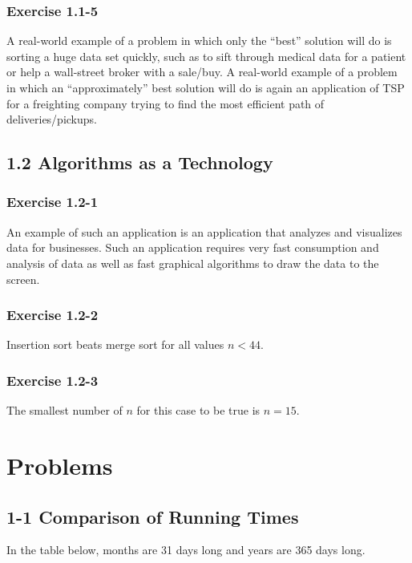 \documentclass{article}
\begin{document}
\subsubsection*{Exercise 1.1-5}

A real-world example of a problem in which only the “best” solution will do is sorting a huge data set quickly, such as to sift through medical data for a patient or help a wall-street broker with a sale/buy. A real-world example of a problem in which an “approximately” best solution will do is again an application of TSP for a freighting company trying to find the most efficient path of deliveries/pickups.

\subsection*{1.2 Algorithms as a Technology}
\subsubsection*{Exercise 1.2-1}

An example of such an application is an application that analyzes and visualizes data for businesses. Such an application requires very fast consumption and analysis of data as well as fast graphical algorithms to draw the data to the screen.

\subsubsection*{Exercise 1.2-2}

Insertion sort beats merge sort for all values $n < 44$.

\subsubsection*{Exercise 1.2-3}

The smallest number of $n$ for this case to be true is $n = 15$.

\section*{Problems}
\subsection*{1-1 Comparison of Running Times}

In the table below, months are 31 days long and years are 365 days long.
\end{document}
